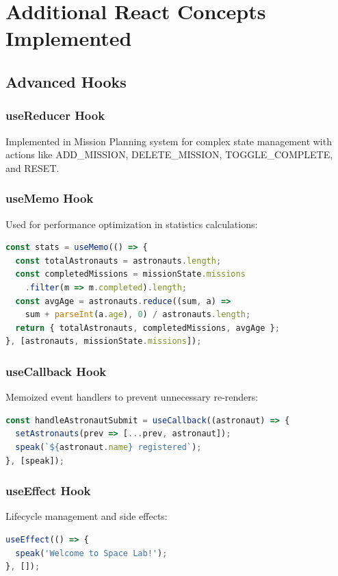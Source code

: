 \documentclass[12pt,a4paper]{article}
\begin{document}
\section{Additional React Concepts Implemented}

\subsection{Advanced Hooks}

\subsubsection{useReducer Hook}
Implemented in Mission Planning system for complex state management with actions like ADD\_MISSION, DELETE\_MISSION, TOGGLE\_COMPLETE, and RESET.

\subsubsection{useMemo Hook}
Used for performance optimization in statistics calculations:
\begin{lstlisting}[language=JavaScript]
const stats = useMemo(() => {
  const totalAstronauts = astronauts.length;
  const completedMissions = missionState.missions
    .filter(m => m.completed).length;
  const avgAge = astronauts.reduce((sum, a) => 
    sum + parseInt(a.age), 0) / astronauts.length;
  return { totalAstronauts, completedMissions, avgAge };
}, [astronauts, missionState.missions]);
\end{lstlisting}

\subsubsection{useCallback Hook}
Memoized event handlers to prevent unnecessary re-renders:
\begin{lstlisting}[language=JavaScript]
const handleAstronautSubmit = useCallback((astronaut) => {
  setAstronauts(prev => [...prev, astronaut]);
  speak(`${astronaut.name} registered`);
}, [speak]);
\end{lstlisting}

\subsubsection{useEffect Hook}
Lifecycle management and side effects:
\begin{lstlisting}[language=JavaScript]
useEffect(() => {
  speak('Welcome to Space Lab!');
}, []);
\end{lstlisting}
\end{document}
